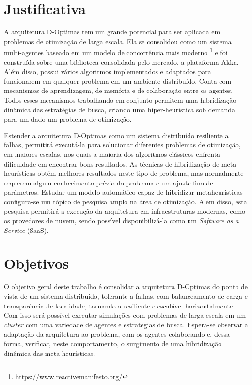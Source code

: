 \section{Justificativa}

A arquitetura D-Optimas tem um grande potencial para ser aplicada em problemas de otimização de larga escala. Ela se consolidou como um sistema multi-agentes baseado em um modelo de concorrência mais moderno \footnote{https://www.reactivemanifesto.org/} e foi construída sobre uma biblioteca consolidada pelo mercado, a plataforma Akka. Além disso, possui vários algoritmos implementados e adaptados para funcionarem em qualquer problema em um ambiente distribuído. Conta com mecanismos de aprendizagem, de memória e de colaboração entre os agentes. Todos esses mecanismos trabalhando em conjunto permitem uma hibridização dinâmica das estratégias de busca, criando uma hiper-heurística sob demanda para um dado um problema de otimização.

Estender a arquitetura D-Optimas como um sistema distribuído resiliente a falhas, permitirá executá-la para solucionar diferentes problemas de otimização, em maiores escalas, nos quais a maioria dos algoritmos clássicos enfrenta dificuldade em encontrar bons resultados. As técnicas de hibridização de meta-heurísticas obtém melhores resultados neste tipo de problema, mas normalmente requerem algum conhecimento prévio do problema e um ajuste fino de parâmetros. Estudar um modelo automático capaz de hibridizar metaheurísticas configura-se um tópico de pesquisa amplo na área de otimização. Além disso, esta pesquisa permitirá a execução da arquitetura em infraestruturas modernas, como os provedores de nuvem, sendo possível  disponibilizá-la como um \textit{Software as a Service} (SaaS).

\section{Objetivos}

O objetivo geral deste trabalho é consolidar a arquitetura D-Optimas do ponto de vista de um sistema distribuído, tolerante a falhas, com balanceamento de carga e transparência de localidade, tornando-a resiliente e escalável horizontalmente. Com isso será possível executar simulações com problemas de larga escala em um \textit{cluster} com uma variedade de agentes e estratégias de busca. Espera-se observar a adaptação da arquitetura ao problema, com os agentes colaborando e, dessa forma, verificar, neste comportamento,  o surgimento de uma hibridização dinâmica das meta-heurísticas.

